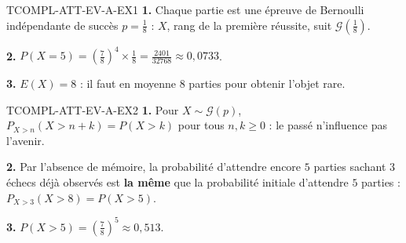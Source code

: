 \begin{corrige}{TCOMPL-ATT-EV-A-EX1}
\textbf{1.} Chaque partie est une épreuve de Bernoulli indépendante de succès $p=\frac{1}{8}$ : $X$, rang de la première réussite, suit $\mathcal{G}\!\left(\frac{1}{8}\right)$.

\textbf{2.} $P(X=5) = \left(\frac{7}{8}\right)^4\times\frac{1}{8} = \frac{2401}{32768} \approx 0{,}0733$.

\textbf{3.} $E(X) = 8$ : il faut en moyenne $8$ parties pour obtenir l'objet rare.
\end{corrige}

\begin{corrige}{TCOMPL-ATT-EV-A-EX2}
\textbf{1.} Pour $X\sim\mathcal{G}(p)$, $P_{X>n}(X>n+k)=P(X>k)$ pour tous $n,k\geq0$ : le passé n'influence pas l'avenir.

\textbf{2.} Par l'absence de mémoire, la probabilité d'attendre encore $5$ parties sachant $3$ échecs déjà observés est \textbf{la même} que la probabilité initiale d'attendre $5$ parties : $P_{X>3}(X>8) = P(X>5)$.

\textbf{3.} $P(X>5) = \left(\frac{7}{8}\right)^5 \approx 0{,}513$.
\end{corrige}

